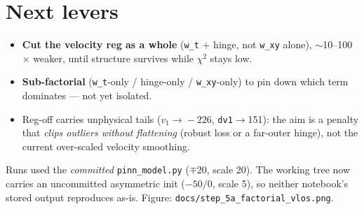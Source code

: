 \documentclass[10pt,a4paper]{article}
\newcommand{\co}[1]{{\small\texttt{#1}}}
\begin{document}
\section{Next levers}

\begin{itemize}
\item \textbf{Cut the velocity reg as a whole} (\co{w\_t} $+$ hinge, not \co{w\_xy} alone), $\sim$10--100$\times$ weaker, until structure survives while $\chi^2$ stays low.
\item \textbf{Sub-factorial} (\co{w\_t}-only / hinge-only / \co{w\_xy}-only) to pin down which term dominates --- not yet isolated.
\item Reg-off carries unphysical tails ($v_1\!\to\!-226$, \co{dv1}$\to$151): the aim is a penalty that \emph{clips outliers without flattening} (robust loss or a far-outer hinge), not the current over-scaled velocity smoothing.
\end{itemize}

\vspace{1pt}{\footnotesize\color{gry}\rule{\textwidth}{0.4pt}}
{\sffamily\color{gry}\footnotesize Runs used the \emph{committed} \co{pinn\_model.py} ($\mp20$, scale 20). The working tree now carries an uncommitted asymmetric init ($-50/0$, scale 5), so neither notebook's stored output reproduces as-is. Figure: \co{docs/step\_5a\_factorial\_vlos.png}.}
\end{document}
